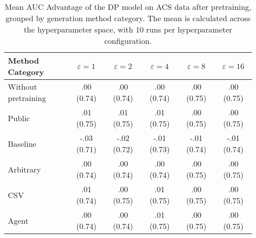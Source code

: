 \begin{table}[h!]
    \centering
    \caption{Mean AUC Advantage of the DP model on ACS data after pretraining, grouped by generation method category. The mean is calculated across the hyperparameter space, with 10 runs per hyperparameter configuration.}
    \label{tab:epsilon_comparison}
    \begin{tabular}{lccccc}
    \toprule
    Method Category & $\varepsilon=1$ & $\varepsilon=2$ & $\varepsilon=4$ & $\varepsilon=8$ & $\varepsilon=16$ \\
    \midrule
    Without pretraining & .00 {\small (0.74)} & .00 {\small (0.74)} & .00 {\small (0.74)} & .00 {\small (0.75)} & .00 {\small (0.75)} \\
    \arrayrulecolor{black!50!}\midrule
    Public & \cellcolor{gold!30}.01 {\small (0.75)} & \cellcolor{gold!30}.01 {\small (0.75)} & \cellcolor{gold!30}.01 {\small (0.75)} & \cellcolor{silver!30}.00 {\small (0.75)} & \cellcolor{gold!30}.00 {\small (0.75)} \\
    \arrayrulecolor{black!50!}\midrule
    Baseline & -.03 {\small (0.71)} & -.02 {\small (0.72)} & -.01 {\small (0.73)} & -.01 {\small (0.74)} & -.01 {\small (0.74)} \\
    \arrayrulecolor{black!50!}\midrule
    Arbitrary & .00 {\small (0.74)} & .00 {\small (0.74)} & .00 {\small (0.74)} & .00 {\small (0.75)} & \cellcolor{bronze!30}.00 {\small (0.75)} \\
    \arrayrulecolor{black!50!}\midrule
    CSV & \cellcolor{silver!30}.01 {\small (0.74)} & \cellcolor{silver!30}.00 {\small (0.75)} & \cellcolor{silver!30}.01 {\small (0.75)} & \cellcolor{gold!30}.00 {\small (0.75)} & \cellcolor{gold!30}.00 {\small (0.75)} \\
    Agent & \cellcolor{bronze!30}.00 {\small (0.74)} & \cellcolor{bronze!30}.00 {\small (0.74)} & \cellcolor{bronze!30}.01 {\small (0.75)} & \cellcolor{bronze!30}.00 {\small (0.75)} & \cellcolor{silver!30}.00 {\small (0.75)} \\
    \bottomrule
    \end{tabular}
\end{table}